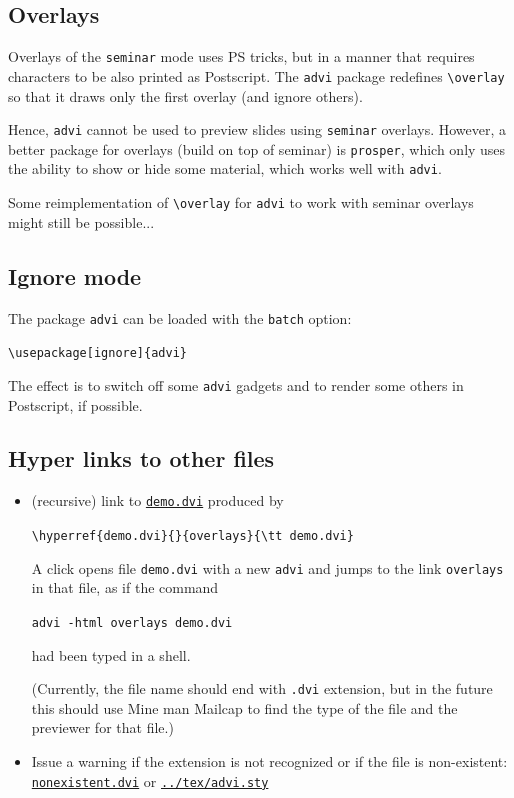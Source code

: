 \documentclass[12pt]{article}
\begin{document}
\newpage

\subsection* {Overlays}
\hypertarget {overlays}{}

Overlays of the \verb"seminar" mode uses PS tricks, but in a manner that
requires characters to be also printed as Postscript. The \verb"advi" package 
redefines \verb"\overlay" so that it draws only the first overlay (and
ignore others).

Hence, \verb"advi" cannot be used to preview slides using \verb"seminar"
overlays. However, a better package for overlays (build on top of seminar)
is \verb"prosper", which only uses the ability to show or hide some
material, which works well with \verb"advi".

Some reimplementation of \verb"\overlay" for \verb"advi" to work with 
seminar overlays might still be possible...  

\subsection* {Ignore mode}

The package \verb"advi" can be loaded with the \verb"batch" option:

\smallskip
{\verb"\usepackage[ignore]{advi}"}
\smallskip

The effect is to switch off some \verb"advi" gadgets and to render some others 
in Postscript, if possible. 


\newpage

\subsection* {Hyper links to other files}

\begin {itemize}

\item
(recursive) link to \hyperref{demo.dvi}{}{overlays}{\tt demo.dvi}
produced by

\qquad\verb"\hyperref{demo.dvi}{}{overlays}{\tt demo.dvi}"

A click opens file \verb"demo.dvi" with a new \verb"advi" and jumps to the
link \verb"overlays" in that file, as if the command

\qquad\verb"advi -html overlays demo.dvi"

had been typed in a shell.

(Currently, the file name should end with \verb".dvi" extension, but in the
future this should use Mine man Mailcap to find the type of the file and the
previewer for that file.)


\item
Issue a warning if the extension is not recognized or if the 
file is non-existent:
\hyperref{nonexistent.dvi}{}{}{\tt nonexistent.dvi}
or
\hyperref{../tex/advi.sty}{}{}{\tt ../tex/advi.sty}



\end {itemize}
\end{document}
